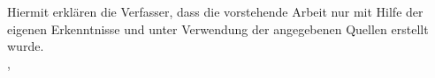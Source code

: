 %
%
%
%
%
%
%
\vspace*{3cm}


\normalsize Hiermit erkl\"aren die Verfasser, dass die vorstehende Arbeit nur mit Hilfe der eigenen Erkenntnisse und unter Verwendung der angegebenen Quellen erstellt wurde.
\vspace*{4cm}\\

\abgabeOrt{}, \abgabeDatum{}
\vspace*{2cm}

\dotfill\\
\emph{\versuchsTeilnehmer{}}
